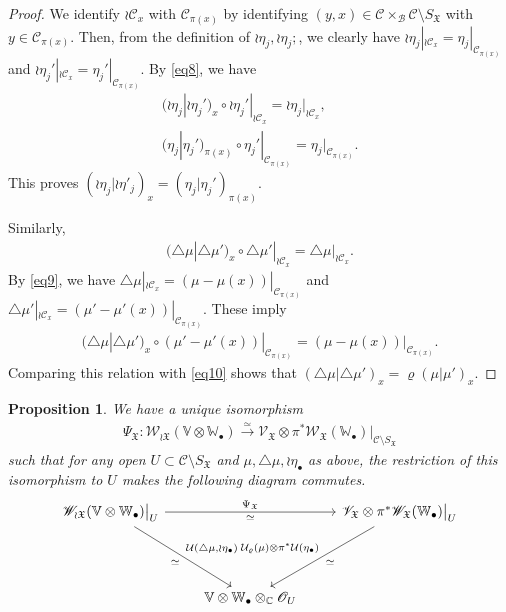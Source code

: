 \documentclass[12pt,a4paper,notitlepage]{article}
\theoremstyle{definition}
\theoremstyle{plain}
\newtheorem{pp}[df]{Proposition}
\newcommand{\fk}{\mathfrak}
\newcommand{\mc}{\mathcal}
\newcommand{\scr}{\mathscr}
\newcommand{\SX}{{S_{\fk X}}}
\newcommand{\blt}{\bullet}
\newcommand{\Vbb}{\mathbb V}
\newcommand{\Wbb}{\mathbb W}
\newcommand{\Cbb}{\mathbb C}
\numberwithin{equation}{section}
\begin{document}
\begin{proof}
We identify $\wr\mc C_x$ with $\mc C_{\pi(x)}$ by identifying $(y,x)\in\mc C\times_{\mc B}\mc C\setminus\SX$ with $y\in\mc C_{\pi(x)}$. Then, from the definition of $\wr\eta_j,\wr\eta_j;$, we clearly have $\wr\eta_j|_{\wr\mc C_x}=\eta_j|_{\mc C_{\pi(x)}}$ and $\wr\eta_j'|_{\wr\mc C_x}=\eta_j'|_{\mc C_{\pi(x)}}$. By \eqref{eq8}, we have
\begin{gather*}
(\wr\eta_j|\wr\eta_j')_x\circ\wr\eta_j'|_{\wr\mc C_x}=\wr\eta_j|_{\wr\mc C_x},\\
(\eta_j|\eta_j')_{\pi(x)}\circ\eta_j'|_{\mc C_{\pi(x)}}=\eta_j|_{\mc C_{\pi(x)}}.
\end{gather*}
This proves $(\wr\eta_j|\wr\eta'_j)_x=(\eta_j|\eta_j')_{\pi(x)}$. 

Similarly, 
\begin{gather*}
(\triangle\mu|\triangle\mu')_x\circ\triangle\mu'|_{\wr\mc C_x}=\triangle\mu|_{\wr\mc C_x}.
\end{gather*}
By \eqref{eq9}, we have $\triangle\mu|_{\wr\mc C_x}=(\mu-\mu(x))|_{\mc C_{\pi(x)}}$ and $\triangle\mu'|_{\wr\mc C_x}=(\mu'-\mu'(x))|_{\mc C_{\pi(x)}}$. These imply
\begin{gather*}
(\triangle\mu|\triangle\mu')_x\circ(\mu'-\mu'(x))|_{\mc C_{\pi(x)}}=(\mu-\mu(x))|_{\mc C_{\pi(x)}}.
\end{gather*}
Comparing this relation with \eqref{eq10} shows that $(\triangle\mu|\triangle\mu')_x=\varrho(\mu|\mu')_x$.
\end{proof}











\begin{pp}\label{lb5}
We have a unique isomorphism
\begin{align}
\Psi_{\fk X}:\scr W_{\wr\fk X}(\Vbb\otimes\Wbb_\blt)\xrightarrow{\simeq} \scr V_{\fk X}\otimes\pi^*\scr W_{\fk X}(\Wbb_\blt)\big|_{\mc C\setminus\SX}\label{eq32}	
\end{align}
such that for any open $U\subset\mc C\setminus\SX$ and $\mu,\triangle\mu,\wr\eta_\blt$ as above, the restriction of this isomorphism to $U$ makes the following diagram commutes.
\begin{equation}
\begin{tikzcd}
\scr W_{\wr\fk X}(\Vbb\otimes\Wbb_\blt)\big|_U \arrow[rr,"\simeq"',"\Psi_{\fk X}"] \arrow[ddr, "\simeq"' ,"{\mc U(\triangle\mu,\wr\eta_\blt)}"]  && \scr V_{\fk X}\otimes\pi^*\scr W_{\fk X}(\Wbb_\blt)\big |_U \arrow[ddl,"\simeq","{\mc U_\varrho(\mu)\otimes\pi^*\mc U(\eta_\blt)}"']\\
{}\\
& \Vbb\otimes\Wbb_\blt\otimes_\Cbb \scr O_U
\end{tikzcd}\label{eq26}	
\end{equation}
\end{pp}
\end{document}
